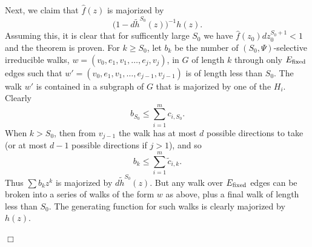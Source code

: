 \documentclass[12pt]{article}
\newcommand{\Ef}{{E_{\rm fixed}}}
\newcommand{\kf}{k^{\rm fixed}}
\newcommand{\tang}{{\psi}}	%
\newcommand{\tset}{{\Psi}}
\newcommand{\proofbox}{\begin{flushright}$\Box$\end{flushright}}
\newcommand{\ird}[1]{{\rm Irred}_{#1}}
\begin{document}
Next, we claim that $\widehat f(z)$ is majorized by
$$
\bigl(1 - d\widetilde h^{S_0}(z)\bigr)^{-1} h(z).
$$
Assuming this, it is clear that for sufficently large $S_0$ we have
$\widehat f(z_0) dz_0^{S_0+1}<1$ and the theorem is proven.
For $k\ge S_0$, let $b_k$ be the number of $(S_0,\tset)$-selective
irreducible walks, $w=(v_0,e_1,v_1,\ldots,e_j,v_j)$,
in $G$ of length $k$ through only $\Ef$ edges such that
$w'=(v_0,e_1,v_1,\ldots,e_{j-1},v_{j-1})$ is of length less than $S_0$.
The walk $w'$ is contained in a subgraph of $G$ that is majorized by
one of the $H_i$.
Clearly
$$
b_{S_0} \le \sum_{i=1}^m c_{i,S_0}.
$$
When $k>S_0$, then from $v_{j-1}$ the walk has at most $d$ possible
directions to take (or at most $d-1$ possible directions if $j>1$),
and so
$$
b_k \le \sum_{i=1}^m \widetilde c_{i,k}.
$$
Thus $\sum b_k z^k$ is majorized by $d\widetilde h^{S_0}(z)$.  But
any walk over $\Ef$ edges can be broken into a series of walks of
the form $w$ as above, plus a final walk of length less than $S_0$.
The generating function for such walks is clearly majorized by $h(z)$.
\proofbox


\end{document}
